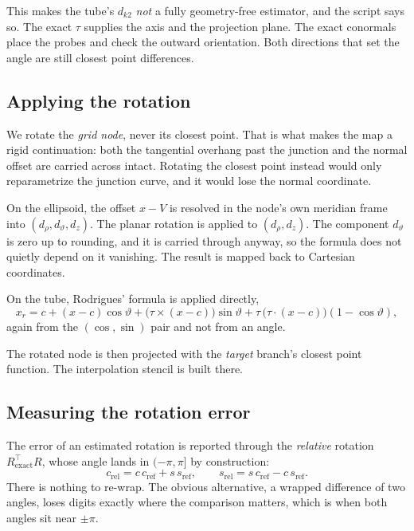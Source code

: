 This makes the tube's $d_{k2}$ \emph{not} a fully geometry-free
estimator, and the script says so. The exact $\tau$ supplies the axis and
the projection plane. The exact conormals place the probes and check the
outward orientation. Both directions that set the angle are still closest
point differences.

\subsection{Applying the rotation}

We rotate the \emph{grid node}, never its closest point. That is what
makes the map a rigid continuation: both the tangential overhang past the
junction and the normal offset are carried across intact. Rotating the
closest point instead would only reparametrize the junction curve, and it
would lose the normal coordinate.

On the ellipsoid, the offset $x-V$ is resolved in the node's own meridian
frame into $(d_\rho, d_\vartheta, d_z)$. The planar rotation is applied
to $(d_\rho, d_z)$. The component $d_\vartheta$ is zero up to rounding,
and it is carried through anyway, so the formula does not quietly depend
on it vanishing. The result is mapped back to Cartesian coordinates.

On the tube, Rodrigues' formula is applied directly,
\begin{equation}
  x_r = c + (x-c)\cos\vartheta + \bigl(\tau\times(x-c)\bigr)\sin\vartheta
        + \tau\,\bigl(\tau\cdot(x-c)\bigr)(1-\cos\vartheta) ,
\end{equation}
again from the $(\cos,\sin)$ pair and not from an angle.

The rotated node is then projected with the \emph{target} branch's
closest point function. The interpolation stencil is built there.

\subsection{Measuring the rotation error}

The error of an estimated rotation is reported through the \emph{relative}
rotation $R_{\mathrm{exact}}^{\!\top} R$, whose angle lands in
$(-\pi,\pi]$ by construction:
\begin{equation}
  c_{\mathrm{rel}} = c\,c_{\mathrm{ref}} + s\,s_{\mathrm{ref}},
  \qquad
  s_{\mathrm{rel}} = s\,c_{\mathrm{ref}} - c\,s_{\mathrm{ref}} .
\end{equation}
There is nothing to re-wrap. The obvious alternative, a wrapped
difference of two angles, loses digits exactly where the comparison
matters, which is when both angles sit near $\pm\pi$.

